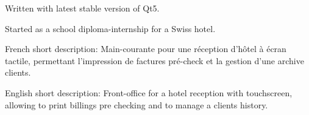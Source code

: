 Written with latest stable version of Qt5.

Started as a school diploma-\/internship for a Swiss hotel.

French short description\-: Main-\/courante pour une réception d'hôtel à écran tactile, permettant l'impression de factures pré-\/check et la gestion d'une archive clients.

English short description\-: Front-\/office for a hotel reception with touchscreen, allowing to print billings pre checking and to manage a clients history. 